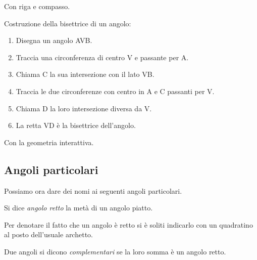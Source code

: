 Con riga e compasso.

\begin{procedura}[Bisettrice]\label{proc:fonda_bisettrice}
  Costruzione della bisettrice di un angolo:
  \begin{enumerate} [nosep]
    \item 
    Disegna un angolo AVB.
    \item 
    Traccia una circonferenza di centro V e passante per A. 
    \item
    Chiama C la sua intersezione con il lato VB.
    \item 
    Traccia le due circonferenze con centro in A e C passanti per V.
    \item 
    Chiama D la loro intersezione diversa da V.    
    \item
    La retta VD è la bisettrice dell'angolo.
  \end{enumerate}
\end{procedura}

Con la geometria interattiva.



\subsection{Angoli particolari}

Possiamo ora dare dei nomi ai seguenti angoli particolari.

\begin{definizione}
Si dice \emph{angolo retto} la metà di un angolo piatto.
\end{definizione}

Per denotare il fatto che un angolo è retto si è soliti indicarlo con 
un quadratino al posto dell'usuale archetto.


\begin{inaccessibleblock}
 \begin{figure}[htb]
\centering
\end{figure}
\end{inaccessibleblock}

\begin{definizione}
Due angoli si dicono \emph{complementari} se la loro somma è un 
angolo retto.
\end{definizione}


\begin{inaccessibleblock}
 \begin{figure}[htb]
\centering
\end{figure}
\end{inaccessibleblock}

